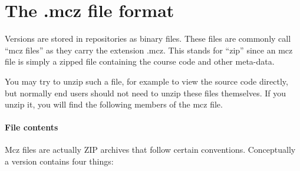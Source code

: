 \documentclass[a4paper,10pt,twoside]{book}
\begin{document}



\section{The .mcz file format}

Versions are stored in repositories as binary files.
These files are commonly call ``mcz files'' as they carry the extension .mcz.
This stands for ``\MC zip'' since an mcz file is simply a zipped file containing the course code and other meta-data.


You may try to unzip such a file, for example to view the source code directly, but normally end users should not need to unzip these files themselves.
If you unzip it, you will find the following members of the mcz file.

\paragraph{File contents}
Mcz files are actually ZIP archives that follow certain conventions. Conceptually a version contains four things:
\end{document}
